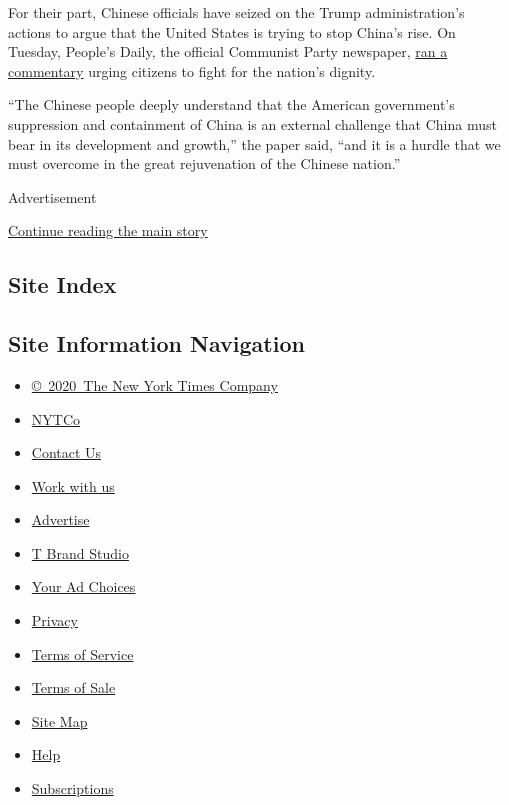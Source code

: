 For their part, Chinese officials have seized on the Trump
administration's actions to argue that the United States is trying to
stop China's rise. On Tuesday, People's Daily, the official Communist
Party newspaper,
\href{Http://opinion.people.com.cn/n1/2019/0625/c1003-31177840.html}{ran
a commentary} urging citizens to fight for the nation's dignity.

``The Chinese people deeply understand that the American government's
suppression and containment of China is an external challenge that China
must bear in its development and growth,'' the paper said, ``and it is a
hurdle that we must overcome in the great rejuvenation of the Chinese
nation.''

Advertisement

\protect\hyperlink{after-bottom}{Continue reading the main story}

\hypertarget{site-index}{%
\subsection{Site Index}\label{site-index}}

\hypertarget{site-information-navigation}{%
\subsection{Site Information
Navigation}\label{site-information-navigation}}

\begin{itemize}
\tightlist
\item
  \href{https://help.nytimes3xbfgragh.onion/hc/en-us/articles/115014792127-Copyright-notice}{©~2020~The
  New York Times Company}
\end{itemize}

\begin{itemize}
\tightlist
\item
  \href{https://www.nytco.com/}{NYTCo}
\item
  \href{https://help.nytimes3xbfgragh.onion/hc/en-us/articles/115015385887-Contact-Us}{Contact
  Us}
\item
  \href{https://www.nytco.com/careers/}{Work with us}
\item
  \href{https://nytmediakit.com/}{Advertise}
\item
  \href{http://www.tbrandstudio.com/}{T Brand Studio}
\item
  \href{https://www.nytimes3xbfgragh.onion/privacy/cookie-policy\#how-do-i-manage-trackers}{Your
  Ad Choices}
\item
  \href{https://www.nytimes3xbfgragh.onion/privacy}{Privacy}
\item
  \href{https://help.nytimes3xbfgragh.onion/hc/en-us/articles/115014893428-Terms-of-service}{Terms
  of Service}
\item
  \href{https://help.nytimes3xbfgragh.onion/hc/en-us/articles/115014893968-Terms-of-sale}{Terms
  of Sale}
\item
  \href{https://spiderbites.nytimes3xbfgragh.onion}{Site Map}
\item
  \href{https://help.nytimes3xbfgragh.onion/hc/en-us}{Help}
\item
  \href{https://www.nytimes3xbfgragh.onion/subscription?campaignId=37WXW}{Subscriptions}
\end{itemize}
